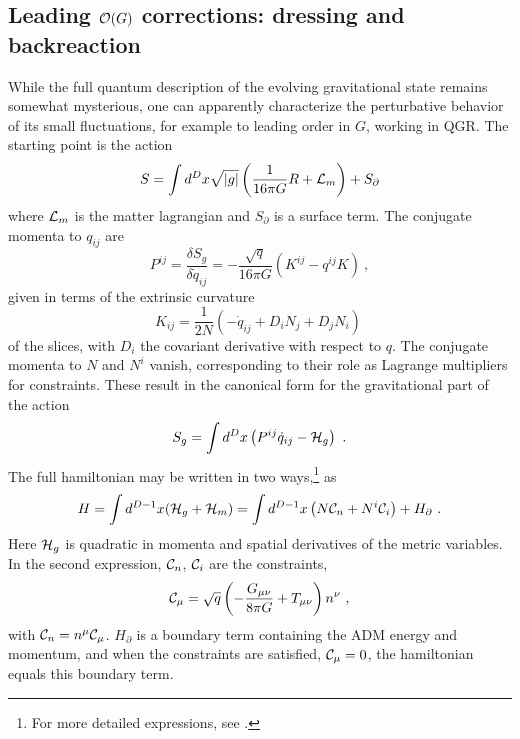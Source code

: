 \documentclass[12pt]{article}
\numberwithin{equation}{section}
\newcommand{\calC}{{\cal C}}
\newcommand{\calo}{{\cal O}}
\newcommand{\calh}{{\cal H}}
\newcommand{\call}{{\cal L}}
\newcommand{\beq}{\begin{equation}}
\newcommand{\eeq}{\end{equation}}
\begin{document}
\subsection{Leading $\calo(G)$ corrections: dressing and backreaction}

While the full quantum description of the evolving gravitational state remains somewhat mysterious, one can apparently characterize the perturbative behavior of its small fluctuations, for example to leading order in $G$, working in QGR.  The starting point is the action
\beq\label{gravaction}
S=\int d^Dx \sqrt{|g|} \left( \frac{1}{16\pi G} R + \call_m\right) + S_\partial
\eeq
where $\call_m$ is the matter lagrangian and $S_\partial$ is a surface term.  
The conjugate momenta to $q_{ij}$ are
\beq
P^{ij}=  \frac{\delta S_g}{\delta \dot q_{ij}} = -\frac{\sqrt q}{16\pi G}\left(K^{ij}- q^{ij} K\right)\ ,
\eeq
given in terms of the extrinsic curvature
\beq\label{excu}
K_{ij}= \frac{1}{2N}\left(-\dot q_{ij} + D_iN_j + D_jN_i\right)\ 
\eeq
of the slices, with $D_i$ the covariant derivative with respect to $q$.  The conjugate momenta to $N$ and $N^i$ vanish, corresponding to their role as Lagrange multipliers for constraints.  These result in the canonical form for the gravitational part of the action
\beq\label{CGact}
S_g = \int d^D x \left( P^{ij}  \dot q_{ij} -  \calh_g\right)\ .
\eeq
The full hamiltonian may be written in two ways,\footnote{For more detailed expressions, see \cite{GiPe2}.} as
\beq\label{Hreln}
H = \int d^{D-1}x (\calh_g+ \calh_m) =  \int d^{D-1}x \left(N \calC_n + N^i \calC_i\right) + H_\partial\ .
\eeq
Here $\calh_g$ is quadratic in momenta and spatial derivatives of the metric variables.  In the second expression, $\calC_n$, $\calC_i$ are the constraints, 
\beq
\calC_\mu =\sqrt q \left( -\frac{G_{\mu\nu}}{8\pi G} + T_{\mu\nu} \right) n^\nu\ ,
\eeq 
with $\calC_n=n^\mu \calC_\mu$.   $H_\partial$ is a boundary term containing the ADM energy and momentum, and when the constraints are satisfied, $\calC_\mu=0$, the hamiltonian equals this boundary term.
\end{document}
